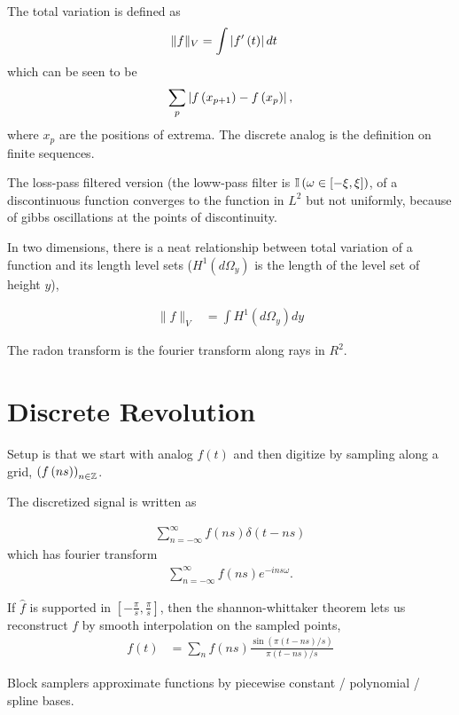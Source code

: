 \documentclass{article}
\begin{document}
The total variation is defined as
\begin{align}
\|f\|_{V} &= \int \left|f^{\prime}\left(t\right)\right|dt
\end{align}
which can be seen to be
\begin{align}
\sum_{p} \left|f\left(x_{p + 1}\right) - f\left(x_{p}\right)\right|,
\end{align}
where $x_{p}$ are the positions of extrema. The discrete analog is the
definition on finite sequences.

The loss-pass filtered version (the loww-pass filter is $\mathbb{I}\left({\omega\in
  \left[-\xi, \xi\right]}\right)$, of a discontinuous function converges to the
function in $L^{2}$ but not uniformly, because of gibbs oscillations at the
points of discontinuity.

In two dimensions, there is a neat relationship between total variation of a
function and its length level sets ($H^{1}\left(d\Omega_{y}\right)$ is the
length of the level set of height $y$),

\begin{align}
\|f\|_{V} &= \int H^{1}\left(d\Omega_{y}\right) dy
\end{align}

The radon transform is the fourier transform along rays in $R^{2}$.

\section{Discrete Revolution}
\label{sec:chapter_3}

Setup is that we start with analog $f\left(t\right)$ and then digitize by
sampling along a grid, $\left(f\left(ns\right)\right)_{n \in \mathbb{Z}}$.

The discretized signal is written as

\begin{align}
\sum_{n = -\infty}^{\infty} f\left(ns\right)\delta\left(t - ns\right)
\end{align}
which has fourier transform
\begin{align}
\sum_{n = -\infty}^{\infty} f\left(ns\right)e^{-ins\omega}.
\end{align}

If $\hat{f}$ is supported in $\left[-\frac{\pi}{s}, \frac{\pi}{s}\right]$, then
the shannon-whittaker theorem lets us reconstruct $f$ by smooth interpolation on
the sampled points,
\begin{align}
f\left(t\right) &= \sum_{n} f\left(ns\right) \frac{\sin\left(\pi\left(t - ns\right) / s\right)}{\pi \left(t - ns\right) / s}
\end{align}

Block samplers approximate functions by piecewise constant / polynomial / spline
bases.
\end{document}
